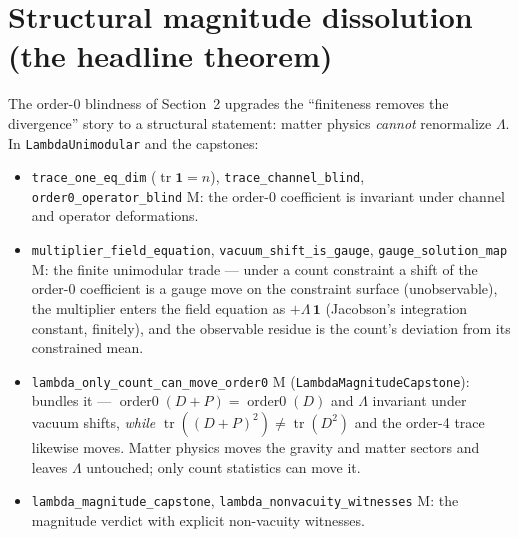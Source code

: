 \documentclass[11pt]{article}
\newcommand{\Lam}{\Lambda}
\newcommand{\Kernel}{\textcolor{kcol}{\textsc{M}}}       %
\newcommand{\lm}[1]{\texttt{#1}}
\begin{document}
\section{Structural magnitude dissolution (the headline theorem)}

The order-0 blindness of Section~2 upgrades the ``finiteness removes the
divergence'' story to a structural statement: matter physics \emph{cannot}
renormalize $\Lam$.  In \lm{LambdaUnimodular} and the capstones:
\begin{itemize}[leftmargin=1.6em,itemsep=1pt]
\item \lm{trace\_one\_eq\_dim} ($\operatorname{tr}\mathbf1 = n$),
  \lm{trace\_channel\_blind}, \lm{order0\_operator\_blind} \Kernel: the order-0
  coefficient is invariant under channel and operator deformations.
\item \lm{multiplier\_field\_equation}, \lm{vacuum\_shift\_is\_gauge},
  \lm{gauge\_solution\_map} \Kernel: the finite unimodular trade --- under a
  count constraint a shift of the order-0 coefficient is a gauge move on the
  constraint surface (unobservable), the multiplier enters the field equation as
  $+\Lam\,\mathbf1$ (Jacobson's integration constant, finitely), and the
  observable residue is the count's deviation from its constrained mean.
\item \lm{lambda\_only\_count\_can\_move\_order0} \Kernel{} (\lm{LambdaMagnitudeCapstone}):
  bundles it --- $\operatorname{order0}(D+P)=\operatorname{order0}(D)$ and
  $\Lam$ invariant under vacuum shifts, \emph{while}
  $\operatorname{tr}((D+P)^2)\neq\operatorname{tr}(D^2)$ and the order-4 trace
  likewise moves.  Matter physics moves the gravity and matter sectors and
  leaves $\Lam$ untouched; only count statistics can move it.
\item \lm{lambda\_magnitude\_capstone}, \lm{lambda\_nonvacuity\_witnesses} \Kernel:
  the magnitude verdict with explicit non-vacuity witnesses.
\end{itemize}
\end{document}
